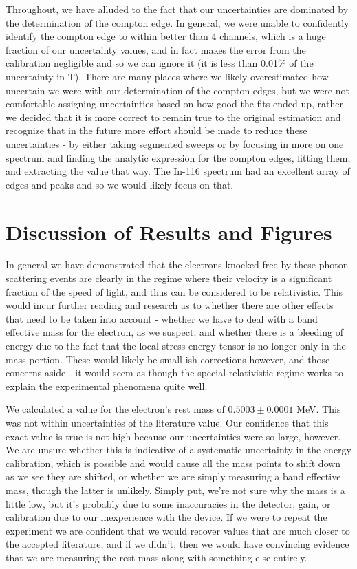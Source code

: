 \documentclass[reprint, nobibnotes, amssymb, amsmath, amsfonts, physics, mathtools, mathrsfs, floatfix]{revtex4-1}
\begin{document}
       Throughout, we have alluded to the fact that our uncertainties are dominated by the determination of the compton edge.  In general, we were unable to confidently identify the compton edge to within better than 4 channels, which is a huge fraction of our uncertainty values, and in fact makes the error from the calibration negligible and so we can ignore it (it is less than 0.01\% of the uncertainty in T).  There are many places where we likely overestimated how uncertain we were with our determination of the compton edges, but we were not comfortable assigning uncertainties based on how good the fits ended up, rather we decided that it is more correct to remain true to the original estimation and recognize that in the future more effort should be made to reduce these uncertainties - by either taking segmented sweeps or by focusing in more on one spectrum and finding the analytic expression for the compton edges, fitting them, and extracting the value that way.  The In-116 spectrum had an excellent array of edges and peaks and so we would likely focus on that.

    \section{Discussion of Results and Figures}
      In general we have demonstrated that the electrons knocked free by these photon scattering events are clearly in the regime where their velocity is a significant fraction of the speed of light, and thus can be considered to be relativistic.  This would incur further reading and research as to whether there are other effects that need to be taken into account - whether we have to deal with a band effective mass for the electron, as we suspect, and whether there is a bleeding of energy due to the fact that the local stress-energy tensor is no longer only in the mass portion.  These would likely be small-ish corrections however, and those concerns aside - it would seem as though the special relativistic regime works to explain the experimental phenomena quite well.

      \hspace{.25cm}

      We calculated a value for the electron's rest mass of $0.5003\pm0.0001$ MeV.  This was not within uncertainties of the literature value.  Our confidence that this exact value is true is not high because our uncertainties were so large, however.  We are unsure whether this is indicative of a systematic uncertainty in the energy calibration, which is possible and would cause all the mass points to shift down as we see they are shifted, or whether we are simply measuring a band effective mass, though the latter is unlikely.  Simply put, we're not sure why the mass is a little low, but it's probably due to some inaccuracies in the detector, gain, or calibration due to our inexperience with the device.  If we were to repeat the experiment we are confident that we would recover values that are much closer to the accepted literature, and if we didn't, then we would have convincing evidence that we are measuring the rest mass along with something else entirely.
\end{document}
